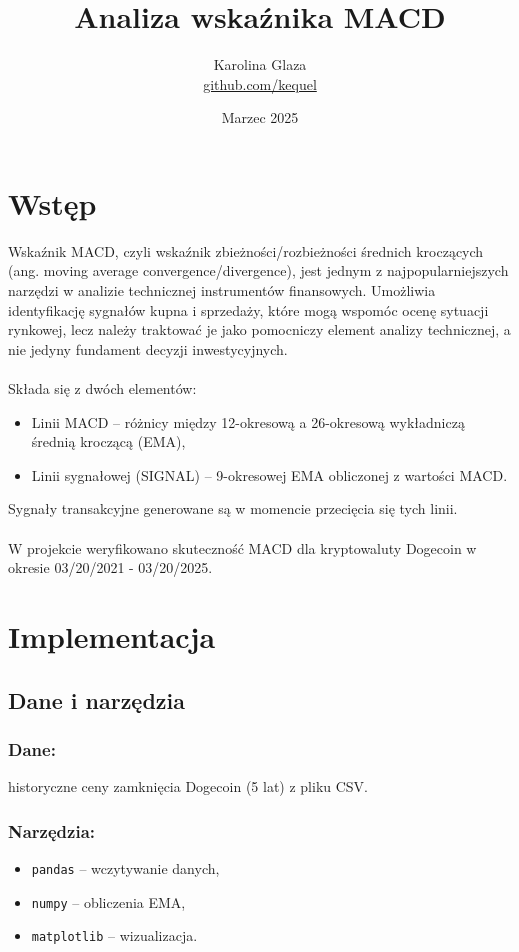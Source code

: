\documentclass[a4paper,12pt]{article}
\title{Analiza wskaźnika MACD}
\author{Karolina Glaza \\ \href{https://github.com/kequel}{github.com/kequel}}
\date{Marzec 2025}
\begin{document}
\maketitle

\section{Wstęp}
Wskaźnik MACD, czyli wskaźnik zbieżności/rozbieżności średnich kroczących (ang. moving average 
convergence/divergence), jest jednym z najpopularniejszych narzędzi w analizie technicznej 
instrumentów finansowych. Umożliwia identyfikację sygnałów kupna i sprzedaży, które mogą wspomóc 
ocenę sytuacji rynkowej, lecz należy traktować je jako pomocniczy element analizy technicznej, a nie 
jedyny fundament decyzji inwestycyjnych. 
\\ \\ Składa się z dwóch elementów: 
\begin{itemize}
    \item Linii MACD – różnicy między 12-okresową a 26-okresową wykładniczą średnią kroczącą (EMA),
    \item Linii sygnałowej (SIGNAL) – 9-okresowej EMA obliczonej z wartości MACD.
\end{itemize}
Sygnały transakcyjne generowane są w momencie przecięcia się tych linii. \\ \\
{\centering W projekcie weryfikowano skuteczność MACD dla kryptowaluty Dogecoin w okresie 03/20/2021 - 
03/20/2025.}

\section{Implementacja}
\subsection{Dane i narzędzia}
\subsubsection{Dane:} historyczne ceny zamknięcia Dogecoin (5 lat) z pliku CSV.

\subsubsection{Narzędzia:}
\begin{itemize}
    \item \texttt{pandas} – wczytywanie danych,
    \item \texttt{numpy} – obliczenia EMA,
    \item \texttt{matplotlib} – wizualizacja. \\
\end{itemize}
\end{document}
